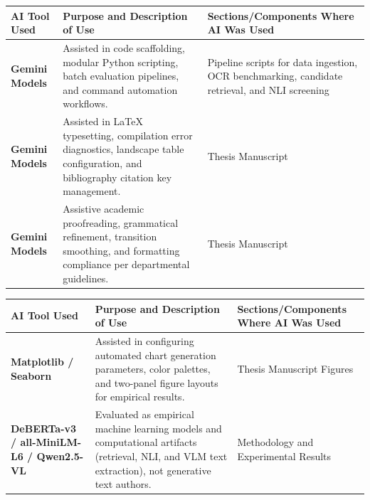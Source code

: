 \documentclass[11pt,letterpaper]{article}
\newif\iffilled
\begin{document}
\vspace{0.15cm}

\iffilled
  \begin{tabularx}{\textwidth}{@{}p{3.0cm} X p{4.6cm}@{}}
    \textbf{AI Tool Used} & \textbf{Purpose and Description of Use} & \textbf{Sections/Components Where AI Was Used} \\[4pt]
    \midrule
    \textbf{Gemini Models} &
    Assisted in code scaffolding, modular Python scripting, batch evaluation pipelines, and command automation workflows. &
    Pipeline scripts for data ingestion, OCR benchmarking, candidate retrieval, and NLI screening \\[7pt]
    
    \textbf{Gemini Models} &
    Assisted in LaTeX typesetting, compilation error diagnostics, landscape table configuration, and bibliography citation key management. &
    Thesis Manuscript \\[7pt]
    
    \textbf{Gemini Models} &
    Assistive academic proofreading, grammatical refinement, transition smoothing, and formatting compliance per departmental guidelines. &
    Thesis Manuscript \\[4pt]
  \end{tabularx}

  \newpage %

  \vspace*{0.1cm}
  \begin{tabularx}{\textwidth}{@{}p{3.0cm} X p{4.6cm}@{}}
    \textbf{AI Tool Used} & \textbf{Purpose and Description of Use} & \textbf{Sections/Components Where AI Was Used} \\[4pt]
    \midrule
    \textbf{Matplotlib / Seaborn} &
    Assisted in configuring automated chart generation parameters, color palettes, and two-panel figure layouts for empirical results. &
    Thesis Manuscript Figures \\[8pt]
    
    \textbf{DeBERTa-v3 / all-MiniLM-L6 / Qwen2.5-VL} &
    Evaluated as empirical machine learning models and computational artifacts (retrieval, NLI, and VLM text extraction), not generative text authors. &
    Methodology and Experimental Results \\[8pt]
  \end{tabularx}
\end{document}
